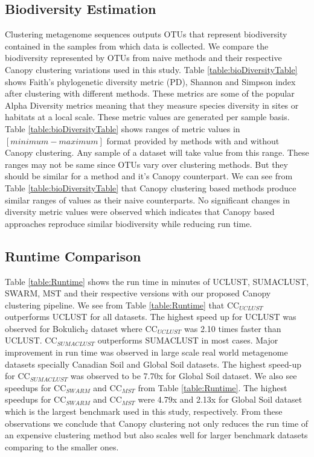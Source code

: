 \documentclass[10pt, conference, compsocconf]{IEEEtran}
\begin{document}
\subsection{\textbf{Biodiversity Estimation}} Clustering metagenome sequences outputs OTUs that represent biodiversity contained in the samples from which data is collected. We compare the biodiversity represented by OTUs from naive methods and their respective Canopy clustering variations used in this study. Table \ref{table:bioDiversityTable} shows Faith’s phylogenetic diversity metric (PD), Shannon and Simpson index after clustering with different methods. These metrics are some of the popular Alpha Diversity metrics meaning that they measure species diversity in sites or habitats at a local scale. These metric values are generated per sample basis. Table \ref{table:bioDiversityTable} shows ranges of metric values in $[minimum-maximum]$ format provided by methods with and without Canopy clustering. Any sample of a dataset will take value from this range. These ranges may not be same since OTUs vary over clustering methods. But they should be similar for a method and it's Canopy counterpart. We can see from Table \ref{table:bioDiversityTable} that Canopy clustering based methods produce similar ranges of values as their naive counterparts. No significant changes in diversity metric values were observed which indicates that Canopy based approaches reproduce similar biodiversity while reducing run time.

\subsection{\textbf{Runtime Comparison}} Table \ref{table:Runtime} shows the run time in minutes of UCLUST, SUMACLUST, SWARM, MST and their respective versions with our proposed Canopy clustering pipeline. We see from Table \ref{table:Runtime} that CC$_{UCLUST}$ outperforms UCLUST for all datasets. The highest speed up for UCLUST was observed for Bokulich$_2$ dataset where CC$_{UCLUST}$ was 2.10 times faster than UCLUST. CC$_{SUMACLUST}$ outperforms SUMACLUST in most cases. Major improvement in run time was observed in large scale real world metagenome datasets specially Canadian Soil and Global Soil datasets. The highest speed-up for CC$_{SUMACLUST}$ was observed to be 7.70x for Global Soil dataset. We also see speedups for CC$_{SWARM}$ and CC$_{MST}$ from Table \ref{table:Runtime}. The highest speedups for CC$_{SWARM}$ and CC$_{MST}$ were 4.79x and 2.13x for Global Soil dataset which is the largest benchmark used in this study, respectively. From these observations we conclude that Canopy clustering not only reduces the run time of an expensive clustering method but also scales well for larger benchmark datasets comparing to the smaller ones.   
\end{document}
